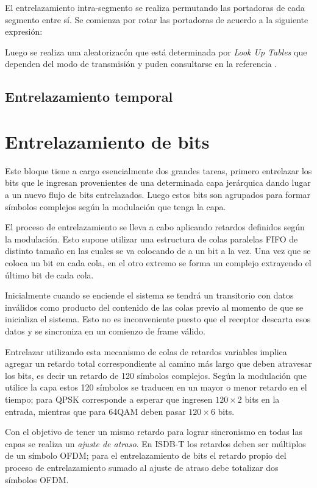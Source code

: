 El entrelazamiento intra-segmento se realiza permutando las portadoras de cada segmento entre s\'i. Se comienza por rotar las portadoras de acuerdo a la siguiente expresi\'on:

Luego se realiza una aleatorizac\'on que est\'a determinada por \textit{Look Up Tables} que dependen del modo de transmisi\'on y puden consultarse en la referencia \cite{bb}.

\subsection{Entrelazamiento temporal}

\section{Entrelazamiento de bits}

Este bloque tiene a cargo esencialmente dos grandes tareas, primero entrelazar los bits que le ingresan provenientes de una determinada capa jerárquica dando lugar a un nuevo flujo de bits entrelazados. Luego estos bits son agrupados para formar símbolos complejos según la modulación que tenga la capa.

El proceso de entrelazamiento se lleva a cabo aplicando retardos definidos según la modulación. Esto supone utilizar una estructura de colas paralelas FIFO de distinto tamaño en las cuales se va colocando de a un bit a la vez. Una vez que se coloca un bit en cada cola, en el otro extremo se forma un complejo extrayendo el último bit de cada cola.

Inicialmente cuando se enciende el sistema se tendrá un transitorio con datos inválidos como producto del contenido de las colas previo al momento de que se inicializa el sistema. Esto no es inconveniente puesto que el receptor descarta esos datos y se sincroniza en un comienzo de frame válido.

Entrelazar utilizando esta mecanismo de colas de retardos variables implica agregar un retardo total correspondiente al camino más largo que deben atravesar los bits, es decir un retardo de 120 símbolos complejos. Según la modulación que utilice la capa estos 120 símbolos se traducen en un mayor o menor retardo en el tiempo; para QPSK corresponde a esperar que ingresen $120 \times 2$ bits en la entrada, mientras que para 64QAM deben pasar $120 \times 6$ bits.

Con el objetivo de tener un mismo retardo para lograr sincronismo en todas las capas se realiza un \textit{ajuste de atraso}. En ISDB-T los retardos deben ser m\'ultiplos de un s\'imbolo OFDM; para el entrelazamiento de bits el retardo propio del proceso de entrelazamiento sumado al ajuste de atraso debe totalizar dos s\'imbolos OFDM.

